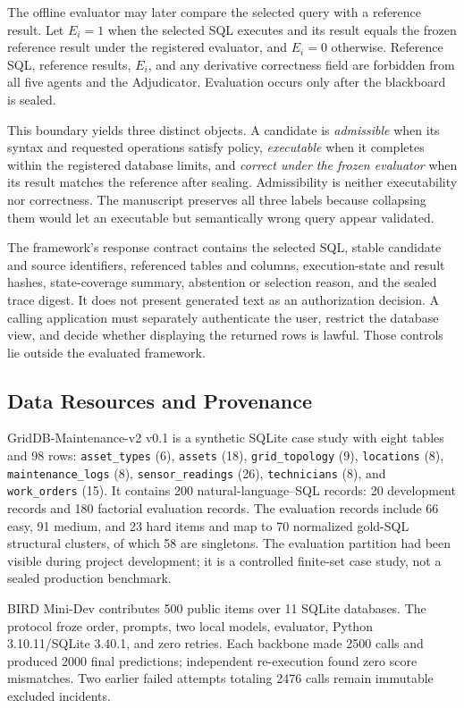 \documentclass[applsci,article,submit,moreauthors]{Definitions/mdpi}
\begin{document}
The offline evaluator may later compare the selected query with a reference result. Let $E_i=1$ when the selected SQL executes and its result equals the frozen reference result under the registered evaluator, and $E_i=0$ otherwise. Reference SQL, reference results, $E_i$, and any derivative correctness field are forbidden from all five agents and the Adjudicator. Evaluation occurs only after the blackboard is sealed.

This boundary yields three distinct objects. A candidate is \emph{admissible} when its syntax and requested operations satisfy policy, \emph{executable} when it completes within the registered database limits, and \emph{correct under the frozen evaluator} when its result matches the reference after sealing. Admissibility is neither executability nor correctness. The manuscript preserves all three labels because collapsing them would let an executable but semantically wrong query appear validated.

The framework's response contract contains the selected SQL, stable candidate and source identifiers, referenced tables and columns, execution-state and result hashes, state-coverage summary, abstention or selection reason, and the sealed trace digest. It does not present generated text as an authorization decision. A calling application must separately authenticate the user, restrict the database view, and decide whether displaying the returned rows is lawful. Those controls lie outside the evaluated framework.

\subsection{Data Resources and Provenance}

GridDB-Maintenance-v2 v0.1 is a synthetic SQLite case study with eight tables and 98 rows: \texttt{asset\_types} (6), \texttt{assets} (18), \texttt{grid\_topology} (9), \texttt{locations} (8), \texttt{maintenance\_logs} (8), \texttt{sensor\_readings} (26), \texttt{technicians} (8), and \texttt{work\_orders} (15). It contains 200 natural-language--SQL records: 20 development records and 180 factorial evaluation records. The evaluation records include 66 easy, 91 medium, and 23 hard items and map to 70 normalized gold-SQL structural clusters, of which 58 are singletons. The evaluation partition had been visible during project development; it is a controlled finite-set case study, not a sealed production benchmark.

BIRD Mini-Dev contributes 500 public items over 11 SQLite databases. The protocol froze order, prompts, two local models, evaluator, Python 3.10.11/SQLite 3.40.1, and zero retries. Each backbone made 2500 calls and produced 2000 final predictions; independent re-execution found zero score mismatches. Two earlier failed attempts totaling 2476 calls remain immutable excluded incidents.
\end{document}
